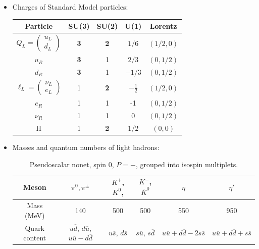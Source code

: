 \documentclass[11pt, oneside]{article}   	%
\theoremstyle{definition}
\numberwithin{equation}{subsection}		%
\begin{document}
\begin{itemize}
	\item Charges of Standard Model particles:
	\begin{table}[H]
	\centering
	\begin{tabular}{ | c | c | c | c | c | }
		\hline
		Particle & SU(3) & SU(2) & U(1) & Lorentz \\
		\hline
		$Q_L = \begin{pmatrix} u_L \\ d_L \end{pmatrix}$ & \textbf{3} & \textbf{2} & $1/6$ & $(1/2, 0)$ \\
		\hline
		$u_R$ & \textbf{3} & 1 & $2/3$ & $(0, 1/2)$ \\
		\hline
		$d_R$ & \textbf{3} & 1 & $-1/3$ & $(0, 1/2)$ \\
		\hline
		$\ell_L = \begin{pmatrix} \nu_L \\ e_L \end{pmatrix}$ & 1 & \textbf{2} & $-\frac{1}{2}$ & $(1/2, 0)$ \\
		\hline
		$e_R$ & 1 & 1 & -1 &  $(0, 1/2)$ \\
		\hline
		$\nu_R$ & 1 & 1 & 0 & $(0, 1/2)$ \\
		\hline
		H & 1 & \textbf{2} & $1/2$ & $(0, 0)$ \\ 
		\hline
	\end{tabular}
	\end{table}
	
	\item Masses and quantum numbers of light hadrons:
	\begin{table}[H]
	\centering
	\begin{tabular}{ | c | c | c | c | c | c | }
		\hline
		Meson & $\pi^0, \pi^\pm$ & $K^+$, $K^0$, & $K^-$, $\overline K^0$ & $\eta$ & $\eta'$ \\
		\hline
		Mass (MeV) & 140 & 500 & 500 & 550 & 950 \\
		\hline
		Quark content & $u\overline d$, $d\overline u$, $u\overline u - d\overline d$ & $u\overline s$, $d\overline s$ & $s\overline u$, $s\overline d$ & $u\overline u + d\overline d - 
		2 s\overline s$ & $u\overline u + d\overline d + s\overline s$ \\
		\hline
	\end{tabular}
	\caption{Pseudoscalar nonet, spin 0, $P = -$, grouped into isospin multiplets.}
	\label{table:pseudoscalar_nonet}
	\end{table}
	

\end{itemize}
\end{document}
